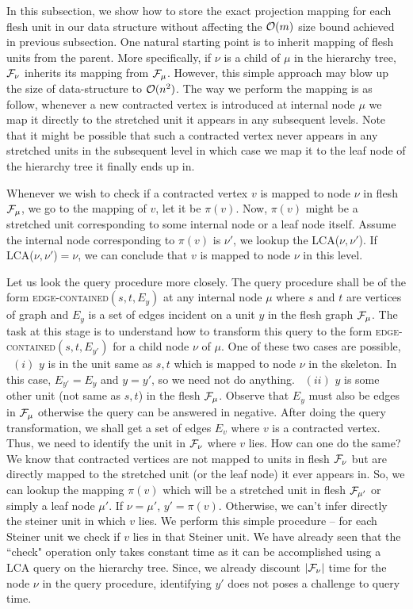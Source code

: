In this subsection, we show how to store the exact projection mapping for each flesh unit in our data structure without affecting the ${\cal O}(m)$ size bound achieved in previous subsection. One natural starting point is to inherit mapping of flesh units from the parent. More specifically, if $\nu$ is a child of $\mu$ in the hierarchy tree, ${\cal F}_\nu$ inherits its mapping from ${\cal F}_\mu$. However, this simple approach may blow up the size of data-structure to ${\cal O}(n^2)$. The way we perform the mapping is as follow, whenever a new contracted vertex is introduced at internal node $\mu$ we map it directly to the stretched unit it appears in any subsequent levels. Note that it might be possible that such a contracted vertex never appears in any stretched units in the subsequent level in which case we map it to the leaf node of the hierarchy tree it finally ends up in. 

Whenever we wish to check if a contracted vertex $v$ is mapped to node $\nu$ in flesh ${\cal F}_\mu$, we go to the mapping of $v$, let it be ${\pi(v)}$. Now, $\pi(v)$ might be a stretched unit corresponding to some internal node or a leaf node itself. Assume the internal node corresponding to $\pi(v)$ is $\nu'$, we lookup the LCA($\nu,\nu'$). If LCA($\nu,\nu'$)$=\nu$, we can conclude that $v$ is mapped to node $\nu$ in this level.

Let us look the query procedure more closely. The query procedure shall be of the form \textsc{edge-contained}$(s,t,E_y)$ at any internal node $\mu$ where $s$ and $t$ are vertices of graph and $E_y$ is a set of edges incident on a unit $y$ in the flesh graph ${\cal F}_\mu$. The task at this stage is to understand how to transform this query to the form \textsc{edge-contained}$(s,t,E_{y'})$ for a child node $\nu$ of $\mu$. One of these two cases are possible, ~$(i)$ $y$ is in the unit same as $s,t$ which is mapped to node $\nu$ in the skeleton. In this case, $E_{y'}=E_y$ and $y=y'$, so we need not do anything. ~$(ii)$ $y$ is some other unit (not same as $s,t$) in the flesh ${\cal F}_\mu$. Observe that $E_y$ must also be edges in ${\cal F}_\mu$ otherwise the query can be answered in negative. After doing the query transformation, we shall get a set of edges $E_{v}$ where $v$ is a contracted vertex. Thus, we need to identify the unit in ${\cal F}_\nu$ where $v$ lies. How can one do the same? We know that contracted vertices are not mapped to units in flesh ${\cal F}_\nu$ but are directly mapped to the stretched unit (or the leaf node) it ever appears in. So, we can lookup the mapping $\pi(v)$ which will be a stretched unit in flesh ${\cal F}_{\mu'}$ or simply a leaf node $\mu'$. If $\nu = \mu'$, $y'=\pi(v)$. Otherwise, we can't infer directly the steiner unit in which $v$ lies. We perform this simple procedure -- for each Steiner unit we check if $v$ lies in that Steiner unit. We have already seen that the ``check" operation only takes constant time as it can be accomplished using a LCA query on the hierarchy tree. Since, we already discount $|{\cal F}_\nu|$ time for the node $\nu$ in the query procedure, identifying $y'$ does not poses a challenge to query time.



